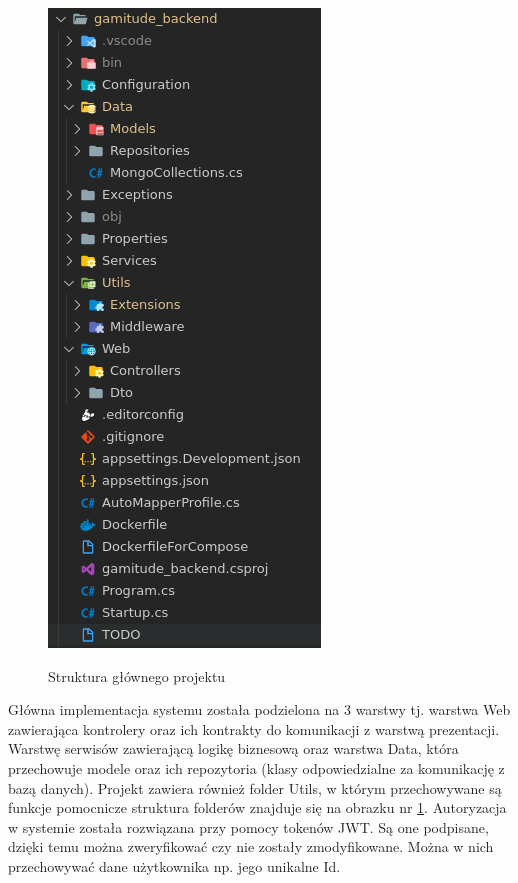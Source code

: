 \documentclass[a4paper,11pt]{report}
\begin{document}
\begin{figure}[H]
	\centering
	\includegraphics[scale=0.4]{implementacja/backend/struktura_folderow_gamitude_backend}\\
	\caption{Struktura głównego projektu}
	\label{fig:gamitude_struct}
\end{figure}
Główna implementacja systemu została podzielona na 3 warstwy tj. warstwa Web zawierająca kontrolery oraz ich kontrakty do komunikacji z warstwą prezentacji.
Warstwę serwisów zawierającą logikę biznesową oraz warstwa Data, która przechowuje modele oraz ich repozytoria (klasy odpowiedzialne za komunikację z bazą danych).
Projekt zawiera również folder Utils, w którym przechowywane są funkcje pomocnicze struktura folderów znajduje się na obrazku nr \ref{fig:gamitude_struct}. Autoryzacja w systemie została rozwiązana przy pomocy tokenów JWT.
Są one podpisane, dzięki temu można zweryfikować czy nie zostały zmodyfikowane. Można w nich przechowywać dane użytkownika np. jego unikalne Id.
\end{document}
